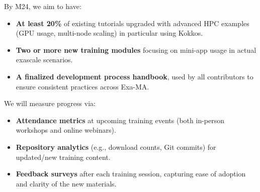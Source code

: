 By M24, we aim to have:
\begin{itemize}
    \item \textbf{At least 20\%} of existing tutorials upgraded with advanced HPC examples (GPU usage, multi-node scaling) in particular using Kokkos.
    \item \textbf{Two or more new training modules} focusing on mini-app usage in actual exascale scenarios.
    \item \textbf{A finalized development process handbook}, used by all contributors to ensure consistent practices across Exa-MA.
\end{itemize}
We will measure progress via:
\begin{itemize}
    \item \textbf{Attendance metrics} at upcoming training events (both in-person workshops and online webinars).
    \item \textbf{Repository analytics} (e.g., download counts, Git commits) for updated/new training content.
    \item \textbf{Feedback surveys} after each training session, capturing ease of adoption and clarity of the new materials.
\end{itemize}

